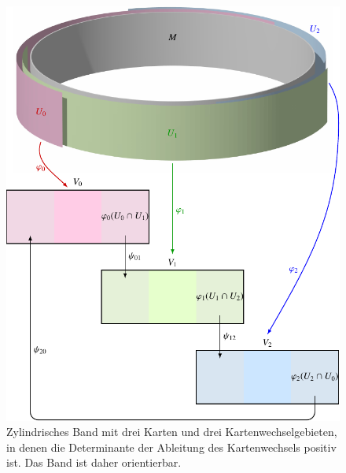 %
%
%
\begin{figure}
\centering
\includegraphics{chapters/040-green/images/band.pdf}
\caption{Zylindrisches Band mit drei Karten und drei Kartenwechselgebieten,
in denen die Determinante der Ableitung des Kartenwechsels positiv ist.
Das Band ist daher orientierbar.
\label{buch:green:green:fig:band}}
\end{figure}
